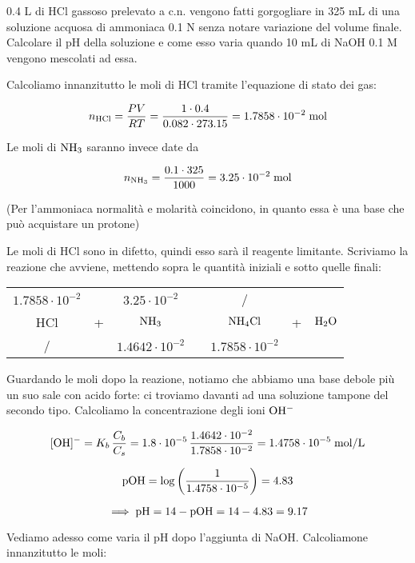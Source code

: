 \begin{esercizio}
    0.4 L di HCl gassoso prelevato a c.n. vengono fatti gorgogliare in 325 mL di una soluzione acquosa di ammoniaca 0.1 N senza notare variazione del volume finale. Calcolare il pH della soluzione e come esso varia quando 10 mL di NaOH 0.1 M vengono mescolati ad essa.
\end{esercizio}
\begin{soluzione}
    Calcoliamo innanzitutto le moli di HCl tramite l'equazione di stato dei gas:

$$n_{\text{HCl}}
=\frac{PV}{RT}
=\frac{1 \cdot 0.4}{0.082 \cdot 273.15}
=1.7858 \cdot 10^{-2} \; \rm mol$$

Le moli di $\rm NH_3$ saranno invece date da

$$n_{\text{NH}_3}
=\frac{0.1 \cdot 325}{1000}
=3.25 \cdot 10^{-2} \; \rm mol$$

(Per l'ammoniaca normalità e molarità coincidono, in quanto essa è una base che può acquistare un protone)

Le moli di HCl sono in difetto, quindi esso sarà il reagente limitante. Scriviamo la reazione che avviene, mettendo sopra le quantità iniziali e sotto quelle finali:

\begin{center}
    \begin{tabular}{ccccccc}
        $1.7858 \cdot 10^{-2}$ &  & $3.25 \cdot 10^{-2}$ & & / & &\\
        HCl & + & $\rm NH_3$ & \ce{->} & $\rm NH_4Cl$ & + & $\rm H_2O$\\
        / &  &  $1.4642 \cdot 10^{-2}$ & & $1.7858 \cdot 10^{-2}$ & &\\
    \end{tabular}
\end{center}

Guardando le moli dopo la reazione, notiamo che abbiamo una base debole più un suo sale con acido forte: ci troviamo davanti ad una soluzione tampone del secondo tipo. Calcoliamo la concentrazione degli ioni $\rm OH^-$

$$[\text{OH}]^-=K_b\,\frac{C_b}{C_s}
=1.8 \cdot 10^{-5}\,\frac{1.4642 \cdot 10^{-2}}{1.7858 \cdot 10^{-2}}
=1.4758 \cdot 10^{-5} \; \rm mol/L$$

$$\rm pOH=\log \left( \frac{1}{1.4758 \cdot 10^{-5}} \right)=4.83$$

$$\implies \rm pH=14-pOH=14-4.83=9.17$$

Vediamo adesso come varia il pH dopo l'aggiunta di NaOH. Calcoliamone innanzitutto le moli:


\end{soluzione}
